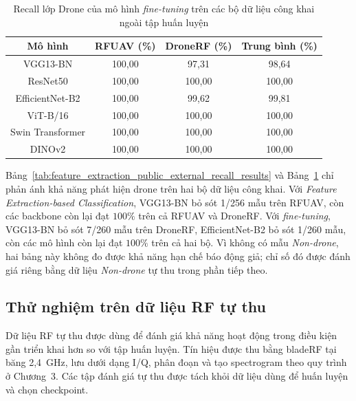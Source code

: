\documentclass[../DoAn.tex]{subfiles}
\begin{document}
\begin{table}[H]
    \centering
    \renewcommand{\arraystretch}{1.3}
    \small
    \setlength{\tabcolsep}{5pt}
    \begin{tabular}{|c|c|c|c|}
        \hline
        \textbf{Mô hình} & \textbf{RFUAV (\%)} & \textbf{DroneRF (\%)} & \textbf{Trung bình (\%)} \\ \hline
        VGG13-BN & 100,00 & 97,31 & 98,64 \\ \hline
        ResNet50 & 100,00 & 100,00 & 100,00 \\ \hline
        EfficientNet-B2 & 100,00 & 99,62 & 99,81 \\ \hline
        ViT-B/16 & 100,00 & 100,00 & 100,00 \\ \hline
        Swin Transformer & 100,00 & 100,00 & 100,00 \\ \hline
        DINOv2 & 100,00 & 100,00 & 100,00 \\ \hline
    \end{tabular}
    \caption{Recall lớp Drone của mô hình \textit{fine-tuning} trên các bộ dữ liệu công khai ngoài tập huấn luyện}
    \label{tab:finetune_public_external_recall_results}
\end{table}
\clearpage
Bảng~\ref{tab:feature_extraction_public_external_recall_results} và Bảng~\ref{tab:finetune_public_external_recall_results} chỉ phản ánh khả năng phát hiện drone trên hai bộ dữ liệu công khai. Với \textit{Feature Extraction-based Classification}, VGG13-BN bỏ sót 1/256 mẫu trên RFUAV, còn các backbone còn lại đạt $100\%$ trên cả RFUAV và DroneRF. Với \textit{fine-tuning}, VGG13-BN bỏ sót 7/260 mẫu trên DroneRF, EfficientNet-B2 bỏ sót 1/260 mẫu, còn các mô hình còn lại đạt $100\%$ trên cả hai bộ. Vì không có mẫu \textit{Non-drone}, hai bảng này không đo được khả năng hạn chế báo động giả; chỉ số đó được đánh giá riêng bằng dữ liệu \textit{Non-drone} tự thu trong phần tiếp theo.

\subsection{Thử nghiệm trên dữ liệu RF tự thu}

Dữ liệu RF tự thu được dùng để đánh giá khả năng hoạt động trong điều kiện gần triển khai hơn so với tập huấn luyện. Tín hiệu được thu bằng bladeRF tại băng 2,4~GHz, lưu dưới dạng I/Q, phân đoạn và tạo spectrogram theo quy trình ở Chương~3. Các tập đánh giá tự thu được tách khỏi dữ liệu dùng để huấn luyện và chọn checkpoint.
\end{document}
